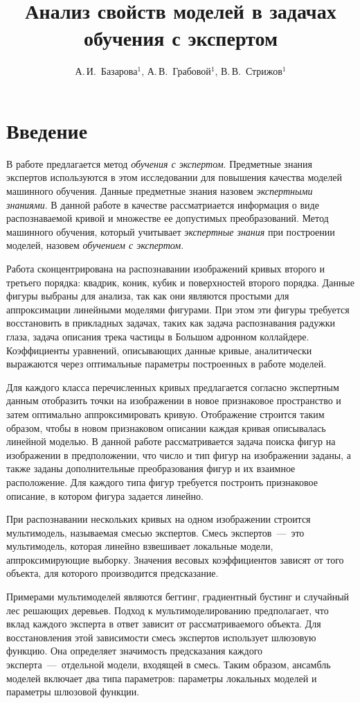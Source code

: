 \documentclass[12pt,twoside]{article}
\title{Анализ свойств моделей в задачах обучения с экспертом}
\author{А.\,И.~Базарова$^1$, А.\,В.~Грабовой$^1$, В.\,В.~Стрижов$^1$} %
\begin{document}
\maketitle
\linenumbers
\section{Введение}
В работе предлагается метод \textit{обучения с экспертом}. 
Предметные знания экспертов используются в этом исследовании для повышения качества моделей машинного обучения.
Данные предметные знания назовем \textit{экспертными знаниями}. В данной работе в качестве   рассматриается информация о виде распознаваемой кривой и множестве ее допустимых преобразований. Метод машинного обучения, который учитывает \textit{экспертные знания} при построении моделей, назовем \textit{обучением с экспертом}. 

Работа сконцентрирована на распознавании изображений кривых второго и третьего порядка: квадрик, коник, кубик и поверхностей второго порядка. Данные фигуры выбраны для анализа, так как они являются простыми для аппроксимации линейными моделями фигурами. При этом эти фигуры требуется восстановить в прикладных задачах, таких как задача распознавания радужки глаза, задача описания трека частицы в Большом адронном коллайдере. Коэффициенты уравнений, описывающих данные кривые, аналитически выражаются через оптимальные параметры построенных в работе моделей.

Для каждого класса перечисленных кривых предлагается согласно экспертным данным отобразить точки на изображении в новое признаковое пространство и затем оптимально аппроксимировать кривую. Отображение строится таким образом, чтобы в новом признаковом описании каждая кривая описывалась линейной моделью. В данной работе рассматривается задача поиска фигур на изображении в предположении, что число и тип фигур на изображении заданы, а также заданы дополнительные преобразования фигур и их взаимное расположение. Для каждого типа фигур требуется построить признаковое описание, в котором фигура задается линейно. 

При распознавании нескольких кривых на одном изображении строится мультимодель, называемая смесью экспертов. Смесь экспертов~---~это мультимодель, которая линейно взвешивает локальные модели, аппроксимирующие выборку. Значения весовых коэффициентов зависят от того объекта, для которого производится предсказание. 

Примерами мультимоделей являются беггинг, градиентный бустинг и случайный лес решающих деревьев. Подход к мультимоделированию предполагает, что вклад каждого эксперта в ответ зависит от рассматриваемого объекта. Для восстановления этой зависимости смесь экспертов использует шлюзовую функцию. Она определяет значимость предсказания каждого эксперта~---~отдельной модели, входящей в смесь. Таким образом, ансамбль моделей включает два типа параметров: параметры локальных моделей и параметры шлюзовой функции.
\end{document}
